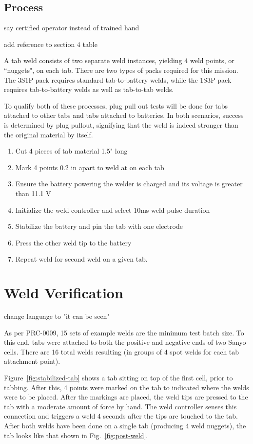 \documentclass{article}
\begin{document}
\subsection{Process}

say certified operator instead of trained hand

add reference to section 4 table

A tab weld consists of two separate weld instances, yielding 4 weld points, or ``nuggets", on each tab. There are two types of packs required for this mission. The 3S1P pack requires standard tab-to-battery welds, while the 1S3P pack requires tab-to-battery welds as well as tab-to-tab welds.

To qualify both of these processes, plug pull out tests will be done for tabs attached to other tabs and tabs attached to batteries. In both scenarios, success is determined by plug pullout, signifying that the weld is indeed stronger than the original material by itself.



\begin{enumerate}
\item Cut 4 pieces of tab material 1.5" long
\item Mark 4 points 0.2 in apart to weld at on each tab
\item Ensure the battery powering the welder is charged and its voltage is greater than 11.1 V
\item Initialize the weld controller and select 10ms weld pulse duration
\item Stabilize the battery and pin the tab with one electrode
\item Press the other weld tip to the battery
\item Repeat weld for second weld on a given tab. 
\end{enumerate}


\section{Weld Verification}

change language to "it can be seen"

As per PRC-0009, 15 sets of example welds are the minimum test batch size. To this end, tabs were attached to both the positive and negative ends of two Sanyo cells. There are 16 total welds resulting (in groups of 4 spot welds for each tab attachment point).

Figure~\ref{fig:stabilized-tab} shows a tab sitting on top of the first cell, prior to tabbing. After this, 4 points were marked on the tab to indicated where the welds were to be placed. After the markings are placed, the weld tips are pressed to the tab with a moderate amount of force by hand. The weld controller senses this connection and triggers a weld 4 seconds after the tips are touched to the tab. After both welds have been done on a single tab (producing 4 weld nuggets), the tab looks like that shown in Fig.~\ref{fig:post-weld}.
\end{document}
